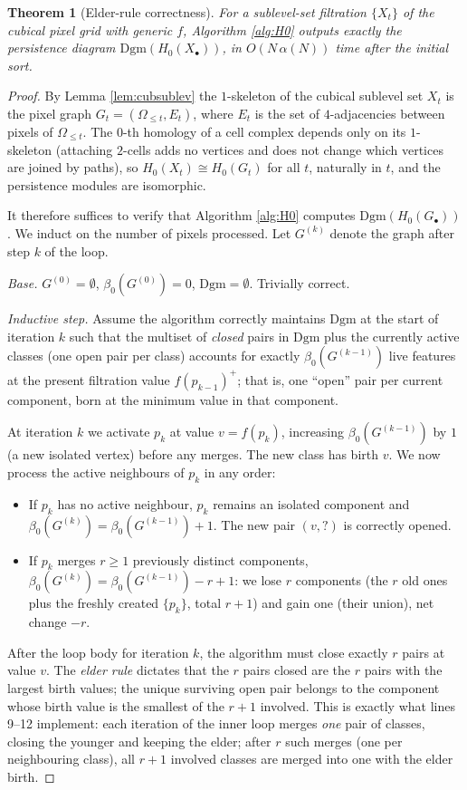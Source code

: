 \documentclass[11pt]{article}
\theoremstyle{persdef}
\newtheorem{theorem}[definition]{Theorem}
\newcommand{\X}{X}
\newcommand{\sublevL}[2]{#1_{\leq #2}}
\newcommand{\PD}{\mathrm{Dgm}}
\newcommand{\Hk}[1]{H_{#1}}
\begin{document}
\begin{theorem}[Elder-rule correctness]\label{thm:elder}
For a sublevel-set filtration $\{\X_t\}$ of the cubical pixel grid with generic $f$, Algorithm \ref{alg:H0} outputs exactly the persistence diagram $\PD(\Hk{0}(\X_\bullet))$, in $O(N\,\alpha(N))$ time after the initial sort.
\end{theorem}

\begin{proof}
By Lemma \ref{lem:cubsublev} the $1$-skeleton of the cubical sublevel set $\X_t$ is the pixel graph $G_t = (\sublevL{\Omega}{t},E_t)$, where $E_t$ is the set of $4$-adjacencies between pixels of $\sublevL{\Omega}{t}$. The $0$-th homology of a cell complex depends only on its $1$-skeleton (attaching $2$-cells adds no vertices and does not change which vertices are joined by paths), so $\Hk{0}(\X_t)\cong\Hk{0}(G_t)$ for all $t$, naturally in $t$, and the persistence modules are isomorphic.

It therefore suffices to verify that Algorithm \ref{alg:H0} computes $\PD(\Hk{0}(G_\bullet))$. We induct on the number of pixels processed. Let $G^{(k)}$ denote the graph after step $k$ of the loop.

\emph{Base.} $G^{(0)}=\emptyset$, $\beta_0(G^{(0)})=0$, $\PD=\emptyset$. Trivially correct.

\emph{Inductive step.} Assume the algorithm correctly maintains $\PD$ at the start of iteration $k$ such that the multiset of \emph{closed} pairs in $\PD$ plus the currently active classes (one open pair per class) accounts for exactly $\beta_0(G^{(k-1)})$ live features at the present filtration value $f(p_{k-1})^+$; that is, one ``open'' pair per current component, born at the minimum value in that component.

At iteration $k$ we activate $p_k$ at value $v=f(p_k)$, increasing $\beta_0(G^{(k-1)})$ by $1$ (a new isolated vertex) before any merges. The new class has birth $v$. We now process the active neighbours of $p_k$ in any order:

\begin{itemize}[leftmargin=2em,itemsep=0.2em]
  \item If $p_k$ has no active neighbour, $p_k$ remains an isolated component and $\beta_0(G^{(k)})=\beta_0(G^{(k-1)})+1$. The new pair $(v,?)$ is correctly opened.
  \item If $p_k$ merges $r\geq 1$ previously distinct components, $\beta_0(G^{(k)})=\beta_0(G^{(k-1)})-r+1$: we lose $r$ components (the $r$ old ones plus the freshly created $\{p_k\}$, total $r+1$) and gain one (their union), net change $-r$.
\end{itemize}
After the loop body for iteration $k$, the algorithm must close exactly $r$ pairs at value $v$. The \emph{elder rule} dictates that the $r$ pairs closed are the $r$ pairs with the largest birth values; the unique surviving open pair belongs to the component whose birth value is the smallest of the $r+1$ involved. This is exactly what lines 9--12 implement: each iteration of the inner loop merges \emph{one} pair of classes, closing the younger and keeping the elder; after $r$ such merges (one per neighbouring class), all $r+1$ involved classes are merged into one with the elder birth.


\end{proof}
\end{document}

